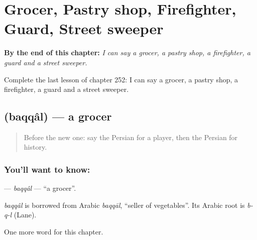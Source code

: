 
\chapter{Grocer, Pastry shop, Firefighter, Guard, Street sweeper}
\label{ch:fa-grocer-pastry-shop-firefighter-guard-street-sweeper}

\begin{chapteropening}
\textbf{By the end of this chapter:} \emph{I can say a grocer, a pastry shop, a firefighter, a guard and a street sweeper.}

Complete the last lesson of chapter 252: I can say a grocer, a pastry shop, a firefighter, a guard and a street sweeper.
\end{chapteropening}

\section[\texorpdfstring{\fa{بقال} (baqqâl)}{بقال (baqqâl)}]{ (baqqâl) — a grocer}

\label{lesson:FA-C252-baqqal}



\begin{quote}
Before the new one: say the Persian for a player, then the Persian for history.
\end{quote}

\subsection*{You'll want to know: }
\textbf{} — \emph{baqqâl} — \textquotedblleft{}a grocer\textquotedblright{}.

\begin{cousinweb}
\emph{baqqâl} is borrowed from Arabic \emph{baqqāl}, \textquotedblleft{}seller of vegetables\textquotedblright{}. Its Arabic root is \emph{b-q-l} (Lane).
\end{cousinweb}

\begin{grammarlens}[title={What you've built}]
One more word for this chapter.
\end{grammarlens}

